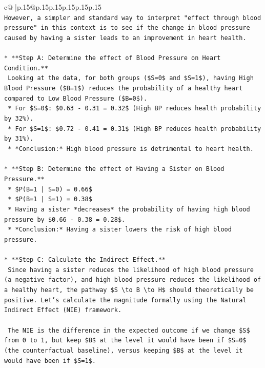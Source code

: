 \documentclass{article}
\begin{document}
{\begin{supertabular}{c@{$\;$}|p{.15\linewidth}@{}p{.15\linewidth}p{.15\linewidth}p{.15\linewidth}p{.15\linewidth}p{.15\linewidth}}
{{{\\ 
\texttt{However, a simpler and standard way to interpret "effect through blood pressure" in this context is to see if the change in blood pressure caused by having a sister leads to an improvement in heart health.} \\
\\ 
\texttt{*   **Step A: Determine the effect of Blood Pressure on Heart Condition.**} \\
\texttt{    Looking at the data, for both groups (\$S=0\$ and \$S=1\$), having High Blood Pressure (\$B=1\$) reduces the probability of a healthy heart compared to Low Blood Pressure (\$B=0\$).} \\
\texttt{    *   For \$S=0\$: \$0.63 {-} 0.31 = 0.32\$ (High BP reduces health probability by 32\%).} \\
\texttt{    *   For \$S=1\$: \$0.72 {-} 0.41 = 0.31\$ (High BP reduces health probability by 31\%).} \\
\texttt{    *   *Conclusion:* High blood pressure is detrimental to heart health.} \\
\\ 
\texttt{*   **Step B: Determine the effect of Having a Sister on Blood Pressure.**} \\
\texttt{    *   \$P(B=1 | S=0) = 0.66\$} \\
\texttt{    *   \$P(B=1 | S=1) = 0.38\$} \\
\texttt{    *   Having a sister *decreases* the probability of having high blood pressure by \$0.66 {-} 0.38 = 0.28\$.} \\
\texttt{    *   *Conclusion:* Having a sister lowers the risk of high blood pressure.} \\
\\ 
\texttt{*   **Step C: Calculate the Indirect Effect.**} \\
\texttt{    Since having a sister reduces the likelihood of high blood pressure (a negative factor), and high blood pressure reduces the likelihood of a healthy heart, the pathway \$S \textbackslash{}to B \textbackslash{}to H\$ should theoretically be positive. Let's calculate the magnitude formally using the Natural Indirect Effect (NIE) framework.} \\
\\ 
\texttt{    The NIE is the difference in the expected outcome if we change \$S\$ from 0 to 1, but keep \$B\$ at the level it would have been if \$S=0\$ (the counterfactual baseline), versus keeping \$B\$ at the level it would have been if \$S=1\$.} \\
}}}
\end{supertabular}}
\end{document}
